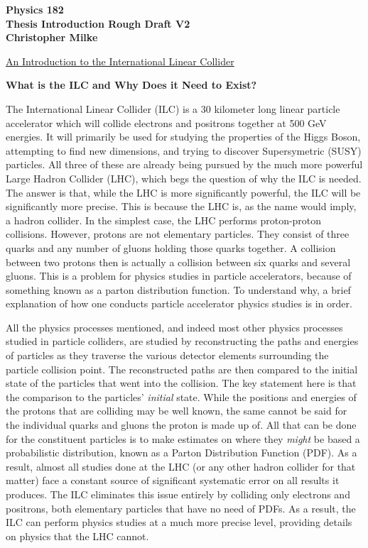 \documentclass{article}
\begin{document}
    \begin{center}
        \bf{\large Physics 182 \\ Thesis Introduction Rough Draft V2 \\ Christopher Milke}
    \end{center}


    \vspace{10mm}
    \begin{center}
        \underline{ \large An Introduction to the International Linear Collider }
    \end{center}
        \begin{center} \bf{What is the ILC and Why Does it Need to Exist?} \end{center}

        The International Linear Collider (ILC) is a 30 kilometer long linear particle accelerator which will collide electrons and positrons together at 500 GeV energies. It will primarily be used for studying the properties of the Higgs Boson, attempting to find new dimensions, and trying to discover Supersymetric (SUSY) particles. All three of these are already being pursued by the much more powerful Large Hadron Collider (LHC), which begs the question of why the ILC is needed. The answer is that, while the LHC is more significantly powerful, the ILC will be significantly more precise. This is because the LHC is, as the name would imply, a hadron collider. In the simplest case, the LHC performs proton-proton collisions. However, protons are not elementary particles. They consist of three quarks and any number of gluons holding those quarks together. A collision between two protons then is actually a collision between six quarks and several gluons. This is a problem for physics studies in particle accelerators, because of something known as a parton distribution function. To understand why, a brief explanation of how one conducts particle accelerator physics studies is in order.

        All the physics processes mentioned, and indeed most other physics processes studied in particle colliders, are studied by reconstructing the paths and energies of particles as they traverse the various detector elements surrounding the particle collision point. The reconstructed paths are then compared to the initial state of the particles that went into the collision. The key statement here is that the comparison to the particles' \textit{initial} state. While the positions and energies of the protons that are colliding may be well known, the same cannot be said for the individual quarks and gluons the proton is made up of. All that can be done for the constituent particles is to make estimates on where they \textit{might} be based a probabilistic distribution, known as a Parton Distribution Function (PDF). As a result, almost all studies done at the LHC (or any other hadron collider for that matter) face a constant source of significant systematic error on all results it produces. The ILC eliminates this issue entirely by colliding only electrons and positrons, both elementary particles that have no need of PDFs. As a result, the ILC can perform physics studies at a much more precise level, providing details on physics that the LHC cannot.
\end{document}
